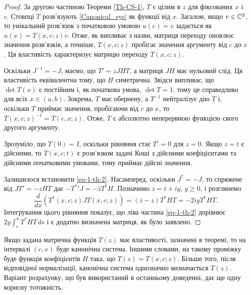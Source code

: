 \begin{proof}
	За другою частиною Теореми \ref{Th-CS-1}, $T$ є цілим в $z$ для фіксованих $x$ і $c$. Стовпці $T$ розв'язують \eqref{Canonical_sys} як функції від $x$. Загалом, якщо $v\in\mathbb{C}^2$, то унікальний розв'язок з початковою умовою $u (c) = v$ задається як $u (x) = T (x, c; z) v$. Отже, як випливає з назви, матриця переходу оновлює значення розв'язків, а точніше, $T (x, c; z)$ пробігає значення аргументу від $c$ до $x$. Ця властивість характеризує матрицю переходу $T (x, c; z)$.

	Оскільки $J^{-1}=-J$, маємо, що $T'= zJHT$, а матриця $JH$ має нульовий слід. Ця властивість еквівалентна тому, що $H$ симетрична. Звідси випливає, що $\det T(x)$ є постійним і, як початкова умова, $\det T = 1$, тому це справедливо для всіх $x \in (a,b)$. Зокрема, $T$ має обернену, а $T^{-1}$ нейтралізує дію $T$ і, оскільки $T$ приймає значення, пробігаючи від $c$ до $x$, то ${T(x,c;z)}^{-1} = T(c,x;z)$. Отже, $T$ є абсолютно неперервною функцією свого другого аргументу.

	Зрозуміло, що $T(0)=I$, оскільки рівняння стає $T'=0$ для $z=0$. Якщо $z=t$ є дійсними, то $T(x,c;t)$ є розв'язком задачі Коші з дійсними коефіцієнтами та дійсними початковими умовами, тому приймає дійсні значення.

	Залишилося встановити \eqref{eq-1-th-2}. Насамперед, оскільки $J^*=-J$, то спряжене від $JT'=-zHT$ дає $-T^{*}{'} J=-\bar{z}T^* H$. Позначимо $z=t+iy$, $y\ge 0$, і розглянемо
	\begin{equation*}
		\frac{d}{dx}(T^*(x,c;z)JT(x,c;z)) = (\bar{z}-z)T^*HT=-2iyT^*HT.
	\end{equation*}
	Інтегрування цього рівняння показує, що ліва частина \eqref{eq-1-th-2} дорівнює $2y\int_c^x T^*HT\,ds$ і є додатно визначена матриця, як було заявлено.
\end{proof}

Якщо задана матрична функція $T(z)$ має властивості, зазначені в теоремі, то на інтервалі $(c,x)$ буде канонічна система. Іншими словами, на такому проміжку буде функція коефіцієнтів $H$ така, що $T(z) = T(x,c;z)$. Більше того, після відповідної нормалізації, канонічна система однозначно визначається $T(z)$. Варіант розрахунку, що був використаний в останньому доведенні, дає ще одну корисну тотожність.

